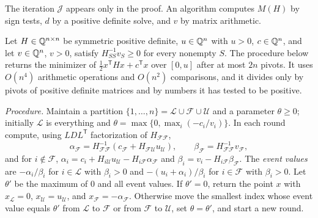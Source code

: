 The iteration $\mathcal J$ appears only in the proof. An algorithm computes
$M(H)$ by sign tests, $d$ by a positive definite solve, and $v$ by matrix
arithmetic.

\begin{lemma}
\label{lem:constraints-box-qp}
Let $H\in\mathbb Q^{n\times n}$ be symmetric positive definite, $u\in\mathbb Q^n$ with
$u>0$, $c\in\mathbb Q^n$, and let $v\in\mathbb Q^n$, $v>0$, satisfy $H_{SS}^{-1}v_S\ge0$
for every nonempty $S$. The procedure below returns the minimizer of
$\frac12x^{\mathsf T}Hx+c^{\mathsf T}x$ over $[0,u]$ after at most $2n$
pivots. It uses $O(n^4)$ arithmetic operations and $O(n^2)$ comparisons, and
it divides only by pivots of positive definite matrices and by numbers it has
tested to be positive.
\end{lemma}

\emph{Procedure.} Maintain a partition $\{1,\ldots,n\}=\mathcal L\cup\mathcal
F\cup\mathcal U$ and a parameter $\theta\ge0$; initially $\mathcal L$ is
everything and $\theta=\max\{0,\max_i(-c_i/v_i)\}$. In each round compute,
using $LDL^{\mathsf T}$ factorization of $H_{\mathcal F\mathcal F}$,
\[
 \alpha_{\mathcal F}=H_{\mathcal F\mathcal F}^{-1}(c_{\mathcal F}+H_{\mathcal F\mathcal U}u_{\mathcal U}),\qquad
 \beta_{\mathcal F}=H_{\mathcal F\mathcal F}^{-1}v_{\mathcal F},
\]
and for $i\notin\mathcal F$,
$\alpha_i=c_i+H_{i\mathcal U}u_{\mathcal U}-H_{i\mathcal F}\alpha_{\mathcal F}$
and $\beta_i=v_i-H_{i\mathcal F}\beta_{\mathcal F}$. The \emph{event values}
are $-\alpha_i/\beta_i$ for $i\in\mathcal L$ with $\beta_i>0$ and
$-(u_i+\alpha_i)/\beta_i$ for $i\in\mathcal F$ with $\beta_i>0$. Let
$\theta'$ be the maximum of $0$ and all event values. If $\theta'=0$, return
the point $x$ with $x_{\mathcal L}=0$, $x_{\mathcal U}=u_{\mathcal U}$, and
$x_{\mathcal F}=-\alpha_{\mathcal F}$. Otherwise move the smallest index whose
event value equals $\theta'$ from $\mathcal L$ to $\mathcal F$ or from
$\mathcal F$ to $\mathcal U$, set $\theta=\theta'$, and start a new round.


